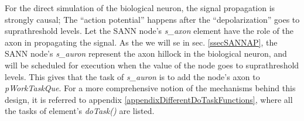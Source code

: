 

	For the direct simulation of the biological neuron, the signal propagation is strongly causal; The ``action potential'' happens after the ``depolarization'' goes to suprathreshold levels.
	Let the SANN node's \emph{s\_axon} element have the role of the axon in propagating the signal.
	As the we will se in sec. \ref{ssecSANNAP}, the SANN node's \emph{s\_auron} represent the axon hillock in the biological neuron, and will be scheduled for execution when the value of the node goes to suprathreshold levels.
	This gives that the task of \emph{s\_auron} is to add the node's axon to \emph{pWorkTaskQue}.
	For a more comprehensive notion of the mechanisms behind this design, it is referred to appendix \ref{appendixDifferentDoTaskFunctions}, where all the tasks of element's \emph{doTask()} are listed.


